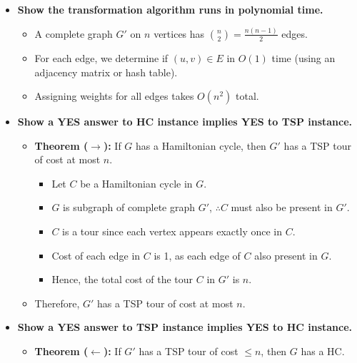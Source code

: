 \documentclass[10pt,landscape]{article}
\newcommand{\1}{\mathmybb{1}}
\begin{document}
\begin{multicols*}{3}
\begin{itemize}[topsep=0pt,noitemsep,wide=0pt, leftmargin=\dimexpr{} + 2\relax]
  \item \textbf{Show the transformation algorithm runs in polynomial time.}
  \begin{itemize}[topsep=0pt,noitemsep,wide=0pt, leftmargin=\dimexpr{} + 2\relax]
      \item A complete graph $G'$ on $n$ vertices has $\binom{n}{2} = \frac{n(n-1)}{2}$ edges.
      \item For each edge, we determine if $(u, v) \in E$ in $O(1)$ time (using an adjacency matrix or hash table).
      \item Assigning weights for all edges takes $O(n^2)$ total.
  \end{itemize}
  \item \textbf{Show a YES answer to HC instance implies YES to TSP instance.}
  \begin{itemize}[topsep=0pt,noitemsep,wide=0pt, leftmargin=\dimexpr{} + 2\relax]
      \item \textbf{Theorem ($\rightarrow$):} If $G$ has a Hamiltonian cycle, then $G'$ has a TSP tour of cost at most $n$.
      \begin{itemize}[topsep=0pt,noitemsep,wide=0pt, leftmargin=\dimexpr{} + 2\relax]
          \item Let $C$ be a Hamiltonian cycle in $G$.
          \item $G$ is subgraph of complete graph $G'$, $\therefore C$ must also be present in $G'$.
          \item $C$ is a tour since each vertex appears exactly once in $C$.
          \item Cost of each edge in $C$ is 1, as each edge of $C$ also present in $G$.
          \item Hence, the total cost of the tour $C$ in $G'$ is $n$.
      \end{itemize}
      \item Therefore, $G'$ has a TSP tour of cost at most $n$.
  \end{itemize}
  \item \textbf{Show a YES answer to TSP instance implies YES to HC instance.}
  \begin{itemize}[topsep=0pt,noitemsep,wide=0pt, leftmargin=\dimexpr{} + 2\relax]
      \item \textbf{Theorem ($\leftarrow$):} If $G'$ has a TSP tour of cost $\leq n$, then $G$ has a HC.
      \begin{itemize}[topsep=0pt,noitemsep,wide=0pt, leftmargin=\dimexpr{} + 2\relax]

\end{itemize}
\end{itemize}
\end{itemize}
\end{multicols*}
\end{document}

